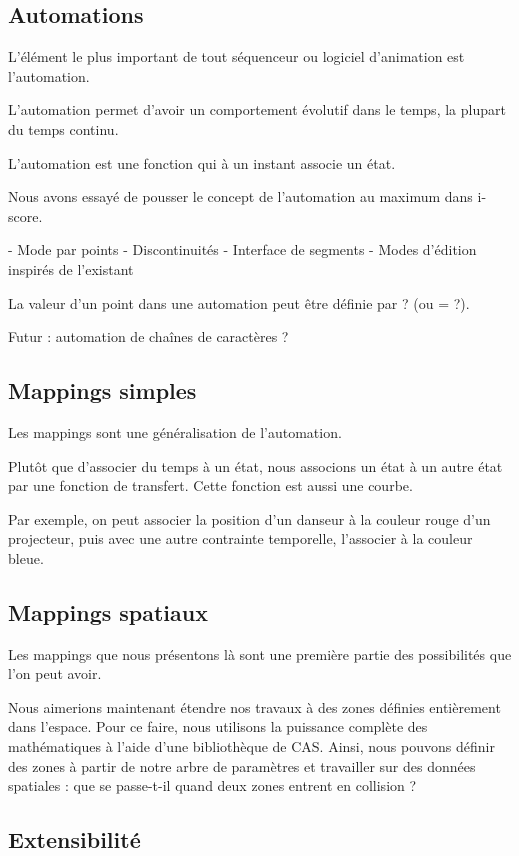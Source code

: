 \documentclass{sigchi}
\begin{document}
\subsection{Automations}
L'élément le plus important de tout séquenceur ou logiciel d'animation est l'automation.

L'automation permet d'avoir un comportement évolutif dans le temps, la plupart du temps continu.

L'automation est une fonction qui à un instant associe un état.

Nous avons essayé de pousser le concept de l'automation au maximum dans i-score.

- Mode par points
- Discontinuités
- Interface de segments
- Modes d'édition inspirés de l'existant

La valeur d'un point dans une automation peut être définie par ? (ou = ?).

Futur : automation de chaînes de caractères ?

\subsection{Mappings simples}
Les mappings sont une généralisation de l'automation.

Plutôt que d'associer du temps à un état, nous associons un état à un autre état par une fonction de transfert. Cette fonction est aussi une courbe.

Par exemple, on peut associer la position d'un danseur à la couleur rouge d'un projecteur, puis avec une autre contrainte temporelle, l'associer à la couleur bleue.


\subsection{Mappings spatiaux}

Les mappings que nous présentons là sont une première partie des possibilités que l'on peut avoir.

Nous aimerions maintenant étendre nos travaux à des zones définies entièrement dans l'espace. Pour ce faire, nous utilisons la puissance complète des mathématiques à l'aide d'une bibliothèque de CAS. Ainsi, nous pouvons définir des zones à partir de notre arbre de paramètres et travailler sur des données spatiales : que se passe-t-il quand deux zones entrent en collision ?
    
\subsection{Extensibilité}
\end{document}
